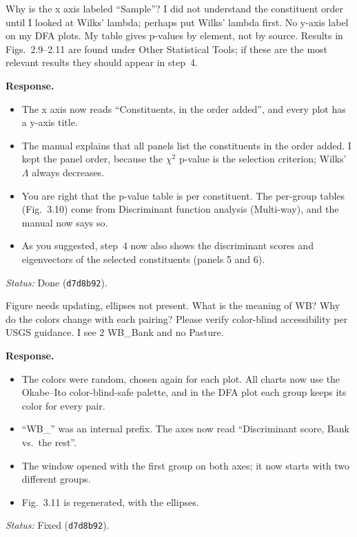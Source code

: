 \documentclass[11pt]{article}
\newcommand{\commit}[1]{\texttt{#1}}
\newcounter{cmt}
\newcounter{grp}
\renewcommand{\thecmt}{\thegrp.\arabic{cmt}}
\newenvironment{reviewer}[1]{%
  \refstepcounter{cmt}%
  \begin{tcolorbox}[enhanced,breakable,colback=commentbg,colframe=usgsgreen!60,
    boxrule=0.4pt,left=6pt,right=6pt,top=4pt,bottom=4pt,
    title={\small\textbf{Comment \thecmt}\hfill\textit{#1}},
    coltitle=black,colbacktitle=usgsgreen!15,fonttitle=\small]}%
  {\end{tcolorbox}}
\newenvironment{response}{\par\noindent\textbf{Response.}\ }{\par\medskip}
\newcommand{\status}[1]{\par\noindent\textit{Status:} #1\par}
\begin{document}
\begin{reviewer}{Multi-way discriminant function analysis}
Why is the x axis labeled ``Sample''? I did not understand the constituent order
until I looked at Wilks' lambda; perhaps put Wilks' lambda first. No y-axis label
on my DFA plots. My table gives p-values by element, not by source. Results in
Figs.~2.9--2.11 are found under Other Statistical Tools; if these are the most
relevant results they should appear in step~4.
\end{reviewer}
\begin{response}
\begin{itemize}
    \item The x axis now reads ``Constituents, in the order added'', and every
          plot has a y-axis title.
    \item The manual explains that all panels list the constituents in the
          order added. I kept the panel order, because the $\chi^2$ p-value is
          the selection criterion; Wilks' $\Lambda$ always decreases.
    \item You are right that the p-value table is per constituent. The
          per-group tables (Fig.~3.10) come from Discriminant function analysis
          (Multi-way), and the manual now says so.
    \item As you suggested, step~4 now also shows the discriminant scores and
          eigenvectors of the selected constituents (panels 5 and 6).
\end{itemize}
\end{response}
\status{Done (\commit{d7d8b92}).}

\begin{reviewer}{Multi-way discriminant function analysis, Fig.~2.10}
Figure needs updating, ellipses not present. What is the meaning of WB? Why do
the colors change with each pairing? Please verify color-blind accessibility per
USGS guidance. I see 2 WB\_Bank and no Pasture.
\end{reviewer}
\begin{response}
\begin{itemize}
    \item The colors were random, chosen again for each plot. All charts now
          use the Okabe--Ito color-blind-safe palette, and in the DFA plot
          each group keeps its color for every pair.
    \item ``WB\_'' was an internal prefix. The axes now read ``Discriminant
          score, Bank vs.\ the rest''.
    \item The window opened with the first group on both axes; it now starts
          with two different groups.
    \item Fig.~3.11 is regenerated, with the ellipses.
\end{itemize}
\end{response}
\status{Fixed (\commit{d7d8b92}).}
\end{document}
